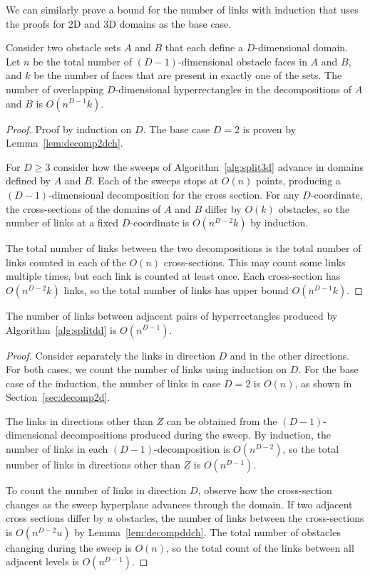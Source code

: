 \documentclass[english,gradu]{tktltiki2018}
\begin{document}
We can similarly prove a bound for the number of links with induction that uses the proofs for 2D and 3D domains as the base case.

\begin{lem}\label{lem:decompddch}
Consider two obstacle sets $A$ and $B$ that each define a $D$-dimensional domain.
Let $n$ be the total number of $(D-1)$-dimensional obstacle faces in $A$ and $B$, and $k$ be the number of faces that are present in exactly one of the sets.
The number of overlapping $D$-dimensional hyperrectangles in the decompositions of $A$ and $B$ is $O(n^{D-1}k)$.
\end{lem}
\begin{proof}
Proof by induction on $D$.
The base case $D=2$ is proven by Lemma~\ref{lem:decomp2dch}.

For $D\ge 3$ consider how the sweeps of Algorithm~\ref{alg:split3d} advance in domains defined by $A$ and $B$.
Each of the sweeps stops at $O(n)$ points, producing a $(D-1)$-dimensional decomposition for the cross section.
For any $D$-coordinate, the cross-sections of the domains of $A$ and $B$ differ by $O(k)$ obstacles, so the number of links at a fixed $D$-coordinate is $O(n^{D-2}k)$ by induction.

The total number of links between the two decompositions is the total number of links counted in each of the $O(n)$ cross-sections.
This may count some links multiple times, but each link is counted at least once.
Each cross-section has $O(n^{D-2}k)$ links, so the total number of links has upper bound $O(n^{D-1}k)$.
\end{proof}

\begin{lem}\label{lem:splitddcount}The number of links between adjacent pairs of hyperrectangles produced by Algorithm~\ref{alg:splitdd} is $O(n^{D-1})$.\end{lem}
\begin{proof}
Consider separately the links in direction $D$ and in the other directions.
For both cases, we count the number of links using induction on $D$.
For the base case of the induction, the number of links in case $D=2$ is $O(n)$, as shown in Section~\ref{sec:decomp2d}.

The links in directions other than $Z$ can be obtained from the $(D-1)$-dimensional decompositions produced during the sweep.
By induction, the number of links in each $(D-1)$-decomposition is $O(n^{D-2})$, so the total number of links in directions other than $Z$ is $O(n^{D-1})$.

To count the number of links in direction $D$, observe how the cross-section changes as the sweep hyperplane advances through the domain.
If two adjacent cross sections differ by $u$ obstacles, the number of links between the cross-sections is $O(n^{D-2}u)$ by Lemma~\ref{lem:decompddch}.
The total number of obstacles changing during the sweep is $O(n)$, so the total count of the links between all adjacent levels is $O(n^{D-1})$.
\end{proof}
\end{document}
